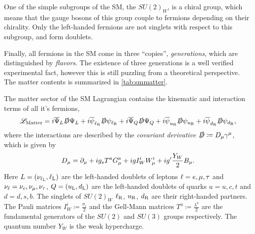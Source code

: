 One of the simple subgroups of the SM, the $SU(2)_W$, is a chiral group,
which means that the gauge bosons of this group couple to fermions depending on their chirality.
Only the left-handed fermions are not singlets with respect to this subgroup,
and form doublets.

Finally, all fermions in the SM come in three ``copies'', \emph{generations}, which 
are distinguished by \emph{flavors}. The existence of three generations is a well verified experimental fact,
however this is still puzzling from a theoretical perspective.
The matter contents is summarized in \cref{tab:smmatter}.

The matter sector of the SM Lagrangian contains the kinematic and interaction
terms of all it's fermions,
\begin{equation}
  {\mathscr{L}}_{\text{Matter}} = i\overline\Psi_L\slashed{D}\Psi_L 
  + i\overline\psi_{\ell_{\mathrm{R}}}\slashed{D}\psi_{\ell_{\mathrm{R}}}
  + i\overline\Psi_Q\slashed{D}\Psi_Q
  + i\overline\psi_{u_{\mathrm{R}}}\slashed{D}\psi_{u_{\mathrm{R}}}
  + i\overline\psi_{d_{\mathrm{R}}}\slashed{D}\psi_{d_{\mathrm{R}}},
\end{equation}
where the interactions are described by the \emph{covariant derivative} $\slashed{D}\coloneqq D_{\mu}\gamma^\mu$, which is given by
\begin{equation}
  D_\mu = \partial_\mu
  +ig_{s} T^a G^a_\mu
  +i g I^i_W W^i_\mu
  +i g' \frac{Y_W}{2} B_\mu
  .
  \label{eq:D}
\end{equation}
Here $L=(\nu_{\ell_{\mathrm{L}}},\ell_{{\mathrm{L}}})$ are the left-handed doublets of leptons $\ell=e,\mu,\tau$ and $\nu_\ell=\nu_e,\nu_\mu,\nu_\tau$, 
$Q=(u_{\mathrm{L}},d_{\mathrm{L}})$ are the left-handed doublets of quarks $u={u,c,t}$ and $d={d,s,b}$.
The singlets of $SU(2)_W$ $\ell_{\mathrm{R}}$, $u_{\mathrm{R}}$, $d_{\mathrm{R}}$ are their right-handed partners.
The Pauli matrices $I^i_W \coloneqq \frac{\sigma_i}{2}$ and the Gell-Mann matrices $T^a \coloneqq \frac{\lambda^a}{2}$ are the fundamental generators of
the $SU(2)$ and $SU(3)$ groups respectively. The quantum number $Y_W$ is the weak hypercharge.



